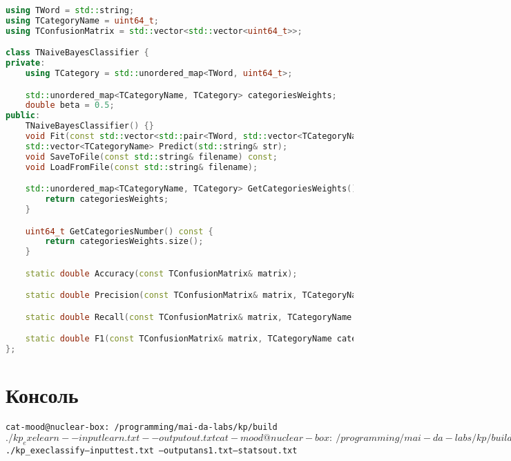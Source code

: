 \begin{lstlisting}[language=C++]
using TWord = std::string;
using TCategoryName = uint64_t;
using TConfusionMatrix = std::vector<std::vector<uint64_t>>;

class TNaiveBayesClassifier {
private:
	using TCategory = std::unordered_map<TWord, uint64_t>;

	std::unordered_map<TCategoryName, TCategory> categoriesWeights;
	double beta = 0.5;
public:
	TNaiveBayesClassifier() {}
	void Fit(const std::vector<std::pair<TWord, std::vector<TCategoryName>>>& data);
	std::vector<TCategoryName> Predict(std::string& str);
	void SaveToFile(const std::string& filename) const;
	void LoadFromFile(const std::string& filename);

	std::unordered_map<TCategoryName, TCategory> GetCategoriesWeights() const {
		return categoriesWeights;
	}

	uint64_t GetCategoriesNumber() const {
		return categoriesWeights.size();
	}

	static double Accuracy(const TConfusionMatrix& matrix);

	static double Precision(const TConfusionMatrix& matrix, TCategoryName category);

	static double Recall(const TConfusionMatrix& matrix, TCategoryName category);

	static double F1(const TConfusionMatrix& matrix, TCategoryName category);
};
\end{lstlisting}
\pagebreak

\section{Консоль}
\begin{alltt}
	cat-mood@nuclear-box:~/programming/mai-da-labs/kp/build$ ./kp_exe learn --input learn.txt --output out.txt
	cat-mood@nuclear-box:~/programming/mai-da-labs/kp/build$ ./kp_exe classify --input test.txt \
	 --output ans1.txt --stats out.txt
\end{alltt}
\pagebreak
